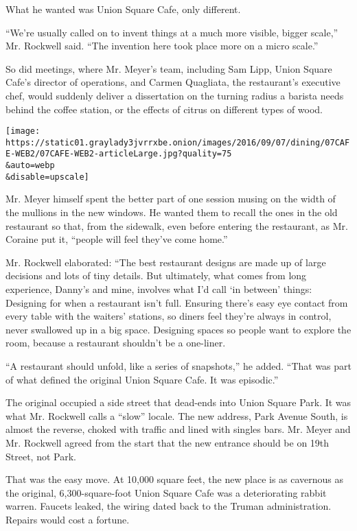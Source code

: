 What he wanted was Union Square Cafe, only different.

``We're usually called on to invent things at a much more visible,
bigger scale,'' Mr. Rockwell said. ``The invention here took place more
on a micro scale.''

So did meetings, where Mr. Meyer's team, including Sam Lipp, Union
Square Cafe's director of operations, and Carmen Quagliata, the
restaurant's executive chef, would suddenly deliver a dissertation on
the turning radius a barista needs behind the coffee station, or the
effects of citrus on different types of wood.

\texttt{[image: https://static01.graylady3jvrrxbe.onion/images/2016/09/07/dining/07CAFE-WEB2/07CAFE-WEB2-articleLarge.jpg?quality=75\\\&auto=webp\\\&disable=upscale]}

Mr. Meyer himself spent the better part of one session musing on the
width of the mullions in the new windows. He wanted them to recall the
ones in the old restaurant so that, from the sidewalk, even before
entering the restaurant, as Mr. Coraine put it, ``people will feel
they've come home.''

Mr. Rockwell elaborated: ``The best restaurant designs are made up of
large decisions and lots of tiny details. But ultimately, what comes
from long experience, Danny's and mine, involves what I'd call `in
between' things: Designing for when a restaurant isn't full. Ensuring
there's easy eye contact from every table with the waiters' stations, so
diners feel they're always in control, never swallowed up in a big
space. Designing spaces so people want to explore the room, because a
restaurant shouldn't be a one-liner.

``A restaurant should unfold, like a series of snapshots,'' he added.
``That was part of what defined the original Union Square Cafe. It was
episodic.''

The original occupied a side street that dead-ends into Union Square
Park. It was what Mr. Rockwell calls a ``slow'' locale. The new address,
Park Avenue South, is almost the reverse, choked with traffic and lined
with singles bars. Mr. Meyer and Mr. Rockwell agreed from the start that
the new entrance should be on 19th Street, not Park.

That was the easy move. At 10,000 square feet, the new place is as
cavernous as the original, 6,300-square-foot Union Square Cafe was a
deteriorating rabbit warren. Faucets leaked, the wiring dated back to
the Truman administration. Repairs would cost a fortune.

